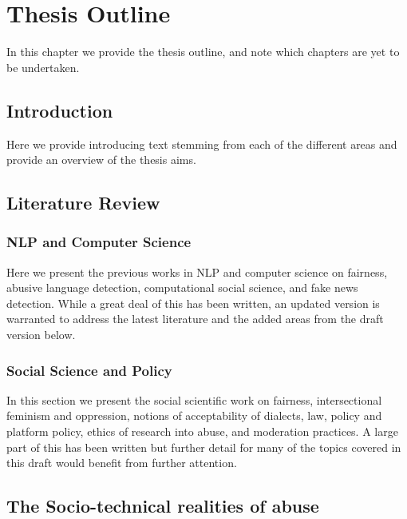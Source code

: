 \chapter{Thesis Outline}
\label{chap:ddp}

\ifpdf
    \graphicspath{{Outline/Figs/Raster/}{Outline/Figs/PDF/}{Outline/Figs/}}
\else
    \graphicspath{{Outline/Figs/Vector/}{Outline/Figs/}}
\fi

In this chapter we provide the thesis outline, and note which chapters are yet to be undertaken.

\section{Introduction}

Here we provide introducing text stemming from each of the different areas and provide an overview of the thesis aims.

\section{Literature Review}

\subsection{NLP and Computer Science}

Here we present the previous works in NLP and computer science on fairness, abusive language detection, computational social science, and fake news detection. While a great deal of this has been written, an updated version is warranted to address the latest literature and the added areas from the draft version below. 

\subsection{Social Science and Policy}
In this section we present the social scientific work on fairness, intersectional feminism and oppression, notions of acceptability of dialects, law, policy and platform policy, ethics of research into abuse, and moderation practices. A large part of this has been written but further detail for many of the topics covered in this draft would benefit from further attention.

\section{The Socio-technical realities of abuse}


